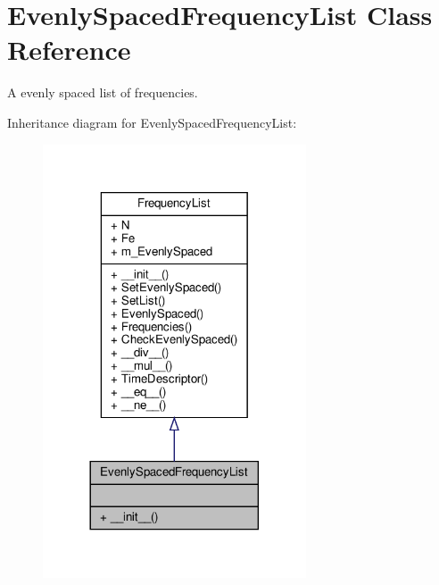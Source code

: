 \hypertarget{classSignalIntegrity_1_1FrequencyDomain_1_1FrequencyList_1_1EvenlySpacedFrequencyList}{}\section{Evenly\+Spaced\+Frequency\+List Class Reference}
\label{classSignalIntegrity_1_1FrequencyDomain_1_1FrequencyList_1_1EvenlySpacedFrequencyList}


A evenly spaced list of frequencies.  




Inheritance diagram for Evenly\+Spaced\+Frequency\+List\+:
\nopagebreak
\begin{figure}[H]
\begin{center}
\leavevmode
\includegraphics[width=221pt]{classSignalIntegrity_1_1FrequencyDomain_1_1FrequencyList_1_1EvenlySpacedFrequencyList__inherit__graph}
\end{center}
\end{figure}


